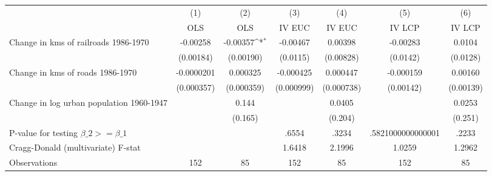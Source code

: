 {
\def\sym#1{\ifmmode^{#1}\else\(^{#1}\)\fi}
\begin{tabular}{l*{6}{c}}
\hline\hline
                &\multicolumn{1}{c}{(1)}&\multicolumn{1}{c}{(2)}&\multicolumn{1}{c}{(3)}&\multicolumn{1}{c}{(4)}&\multicolumn{1}{c}{(5)}&\multicolumn{1}{c}{(6)}\\
                &\multicolumn{1}{c}{OLS}&\multicolumn{1}{c}{OLS}&\multicolumn{1}{c}{IV EUC}&\multicolumn{1}{c}{IV EUC}&\multicolumn{1}{c}{IV LCP}&\multicolumn{1}{c}{IV LCP}\\
\hline
Change in kms of railroads 1986-1970& -0.00258         & -0.00357\sym{*}  & -0.00467         &  0.00398         & -0.00283         &   0.0104         \\
                &(0.00184)         &(0.00190)         & (0.0115)         &(0.00828)         & (0.0142)         & (0.0128)         \\
[1em]
Change in kms of roads 1986-1970&-0.0000201         & 0.000325         &-0.000425         & 0.000447         &-0.000159         &  0.00160         \\
                &(0.000357)         &(0.000359)         &(0.000999)         &(0.000738)         &(0.00142)         &(0.00139)         \\
[1em]
Change in log urban population 1960-1947&                  &    0.144         &                  &   0.0405         &                  &   0.0253         \\
                &                  &  (0.165)         &                  &  (0.204)         &                  &  (0.251)         \\
\hline
P-value for testing $\beta\_{2} >= \beta\_{1}$&                  &                  &    .6554         &    .3234         &.5821000000000001         &    .2233         \\
Cragg-Donald (multivariate) F-stat&                  &                  &   1.6418         &   2.1996         &   1.0259         &   1.2962         \\
Observations    &      152         &       85         &      152         &       85         &      152         &       85         \\
\hline\hline
\end{tabular}
}
